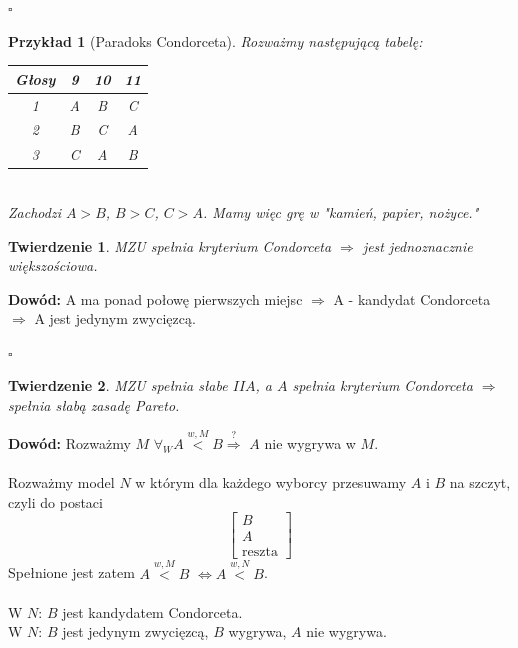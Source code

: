 \documentclass[12pt,a4paper]{article}
\theoremstyle{break}
\newtheorem{theorem}{Twierdzenie}[section]
\newtheorem{example}{Przykład}[section]
\newcommand{\witw}{$\Leftrightarrow$}
\begin{document}
		\begin{flushright}$\square$\end{flushright}
		
		\begin{example}[Paradoks Condorceta]
			Rozważmy następującą tabelę:\\
			\begin{tabular}{|c|c|c|c|}\hline
				Głosy&9&10&11\\\hline
				1&A&B&C\\\hline
				2&B&C&A\\\hline
				3&C&A&B\\\hline
			\end{tabular}\\
			
			Zachodzi $A>B$, $B>C$, $C>A$. Mamy więc grę w "kamień, papier, nożyce."
		\end{example}
		
		\begin{theorem}
			MZU spełnia kryterium Condorceta $\Rightarrow$ jest jednoznacznie większościowa.
		\end{theorem}
		\noindent \textbf{Dowód:} A ma ponad połowę pierwszych miejsc $\Rightarrow$ A - kandydat Condorceta $\Rightarrow$ A jest jedynym zwycięzcą.		
		
		\begin{flushright}$\square$\end{flushright}
		
		\begin{theorem}
			MZU spełnia słabe $IIA$, a $A$ spełnia kryterium Condorceta $\Rightarrow$ spełnia słabą zasadę Pareto.
		\end{theorem}
		\noindent \textbf{Dowód:} Rozważmy $M$ $\forall_{W} A\overset{w,M}{<}B \overset{?}{\Rightarrow}$ $A$ nie wygrywa w $M$.\\\\
		
		Rozważmy model $N$ w którym dla każdego wyborcy przesuwamy $A$ i $B$ na szczyt, czyli do postaci 
		$$\begin{bmatrix}
			B\\
			A\\
			\text{reszta}
		\end{bmatrix}$$
		Spełnione jest zatem $A\overset{w,M}{<}B$ \witw $A\overset{w,N}{<}B$.\\\\
		W $N$: $B$ jest kandydatem Condorceta.\\
		W $N$: $B$ jest jedynym zwycięzcą, $B$ wygrywa, $A$ nie wygrywa. \\
		
\end{document}
